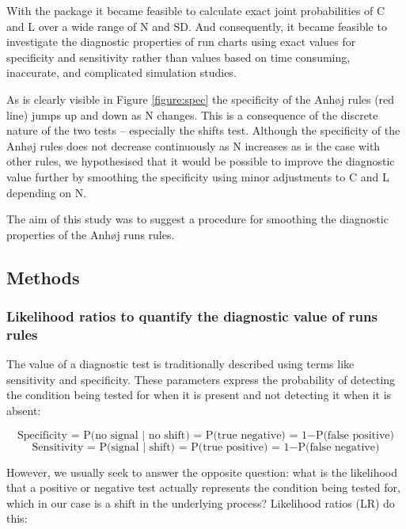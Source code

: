 With the  package it became feasible to calculate
exact joint probabilities of C and L over a wide range of N and SD. And
consequently, it became feasible to investigate the diagnostic
properties of run charts using exact values for specificity and
sensitivity rather than values based on time consuming, inaccurate, and
complicated simulation studies.

As is clearly visible in Figure \ref{figure:spec} the specificity of the
Anhøj rules (red line) jumps up and down as N changes. This is a
consequence of the discrete nature of the two tests -- especially the
shifts test. Although the specificity of the Anhøj rules does not
decrease continuously as N increases as is the case with other rules, we
hypothesised that it would be possible to improve the diagnostic value
further by smoothing the specificity using minor adjustments to C and L
depending on N.

The aim of this study was to suggest a procedure for smoothing the
diagnostic properties of the Anhøj runs rules.

\hypertarget{methods}{%
\subsection{Methods}\label{methods}}

\hypertarget{likelihood-ratios-to-quantify-the-diagnostic-value-of-runs-rules}{%
\subsubsection{Likelihood ratios to quantify the diagnostic value of
runs
rules}\label{likelihood-ratios-to-quantify-the-diagnostic-value-of-runs-rules}}

The value of a diagnostic test is traditionally described using terms
like sensitivity and specificity. These parameters express the
probability of detecting the condition being tested for when it is
present and not detecting it when it is absent:

\[ \text{Specificity = P(no signal | no shift) = P(true negative) = 1} - \text{P(false positive)} \]
\[ \text{Sensitivity = P(signal | shift) = P(true positive) = 1} - \text{P(false negative)} \]

However, we usually seek to answer the opposite question: what is the
likelihood that a positive or negative test actually represents the
condition being tested for, which in our case is a shift in the
underlying process? Likelihood ratios (LR) do this:

